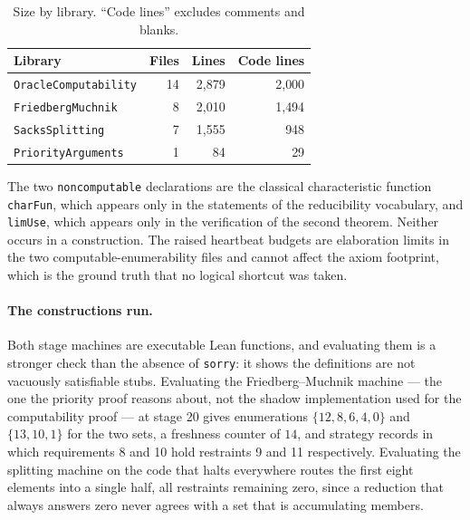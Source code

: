 \begin{table}[h]
\centering
\small
\begin{tabular}{lrrr}
\toprule
Library & Files & Lines & Code lines \\
\midrule
\texttt{OracleComputability} & 14 & 2{,}879 & 2{,}000 \\
\texttt{FriedbergMuchnik} & 8 & 2{,}010 & 1{,}494 \\
\texttt{SacksSplitting} & 7 & 1{,}555 & 948 \\
\texttt{PriorityArguments} & 1 & 84 & 29 \\
\bottomrule
\end{tabular}
\caption{Size by library.  ``Code lines'' excludes comments and blanks.}
\end{table}

The two \texttt{noncomputable} declarations are the classical
characteristic function \texttt{charFun}, which appears only in the
statements of the reducibility vocabulary, and \texttt{limUse}, which
appears only in the verification of the second theorem.  Neither occurs in
a construction.  The raised heartbeat budgets are elaboration limits in the
two computable-enumerability files and cannot affect the axiom footprint,
which is the ground truth that no logical shortcut was taken.

\paragraph{The constructions run.}
Both stage machines are executable Lean functions, and evaluating them is a
stronger check than the absence of \texttt{sorry}: it shows the definitions
are not vacuously satisfiable stubs.  Evaluating the Friedberg--Muchnik
machine --- the one the priority proof reasons about, not the shadow
implementation used for the computability proof --- at stage 20 gives
enumerations $\{12,8,6,4,0\}$ and $\{13,10,1\}$ for the two sets, a
freshness counter of $14$, and strategy records in which requirements 8 and
10 hold restraints 9 and 11 respectively.  Evaluating the splitting machine
on the code that halts everywhere routes the first eight elements into a
single half, all restraints remaining zero, since a reduction that always
answers zero never agrees with a set that is accumulating members.
